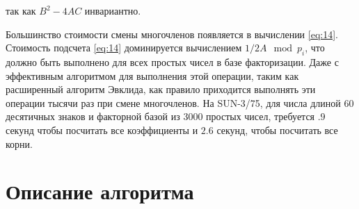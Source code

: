 \documentclass[a4paper,12pt]{report}
\begin{document}
так как $B^2 - 4AC$ инвариантно.

Большинство стоимости смены многочленов появляется в вычислении \eqref{eq:14}. Стоимость подсчета \eqref{eq:14} доминируется вычислением $1/2A \mod p_i$, что должно быть выполнено для всех простых чисел в базе факторизации. Даже с эффективным алгоритмом для выполнения этой операции, таким как расширенный алгоритм Эвклида, как правило приходится выполнять эти операции тысячи раз при смене многочленов. На SUN-3/75, для числа длиной 60 десятичных знаков и факторной базой из 3000 простых чисел, требуется $.9$ секунд чтобы посчитать все коэффициенты и $2.6$ секунд, чтобы посчитать все корни.

\section{Описание алгоритма}
\end{document}
